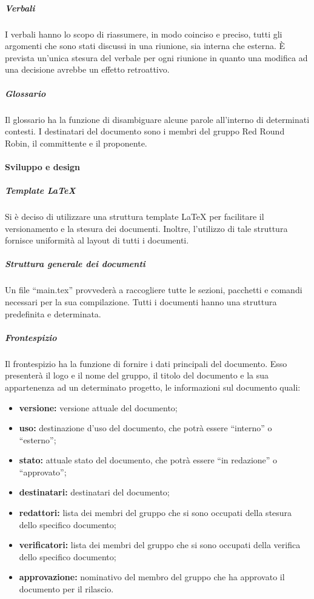 				\subparagraph{Verbali}
					I verbali hanno lo scopo di riassumere, in modo coinciso e preciso, tutti gli argomenti che sono stati discussi in una riunione, sia interna che esterna. È prevista un'unica stesura del verbale per ogni riunione in quanto una modifica ad una decisione avrebbe un effetto retroattivo.
				\subparagraph{Glossario}
				Il glossario ha la funzione di disambiguare alcune parole all'interno di determinati contesti. I destinatari del documento sono i membri del gruppo Red Round Robin, il committente e il proponente.

			\paragraph{Sviluppo e design}
				\subparagraph{Template LaTeX}
					Si è deciso di utilizzare una struttura template \LaTeX{} per facilitare il versionamento e la stesura dei documenti. Inoltre, l'utilizzo di tale struttura fornisce uniformità al layout di tutti i documenti.
				\subparagraph{Struttura generale dei documenti}
					Un file ``main.tex'' provvederà a raccogliere tutte le sezioni, pacchetti e comandi necessari per la sua compilazione. Tutti i documenti hanno una struttura predefinita e determinata.
				\subparagraph{Frontespizio}
					Il frontespizio ha la funzione di fornire i dati principali del documento. Esso presenterà il logo e il nome del gruppo, il titolo del documento e la sua appartenenza ad un determinato progetto, le informazioni sul documento quali:
					\begin{itemize}
						\item \textbf{versione:} versione attuale del documento;
						\item \textbf{uso:} destinazione d'uso del documento, che potrà essere ``interno'' o ``esterno'';
						\item \textbf{stato:} attuale stato del documento, che potrà essere ``in redazione'' o ``approvato'';
						\item \textbf{destinatari:} destinatari del documento;
						\item \textbf{redattori:} lista dei membri del gruppo che si sono occupati della stesura dello specifico documento;
						\item \textbf{verificatori:} lista dei membri del gruppo che si sono occupati della verifica dello specifico documento;
						\item \textbf{approvazione:} nominativo del membro del gruppo che ha approvato il documento per il rilascio.
					\end{itemize}
